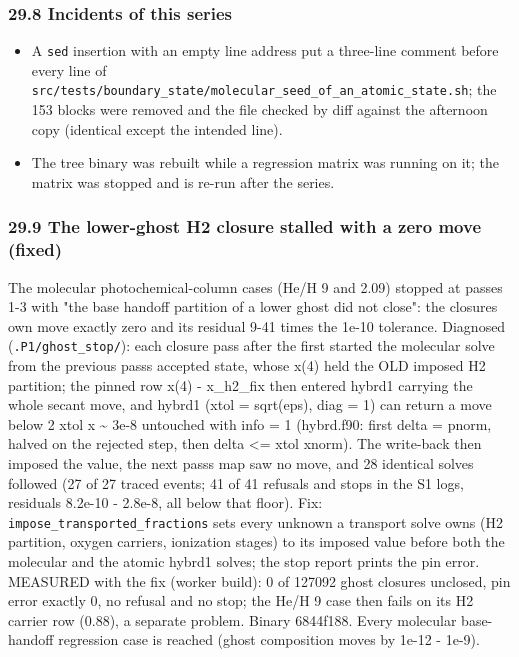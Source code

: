 \documentclass[english,a4paper]{my_memo}
\providecommand{\tightlist}{\setlength{\itemsep}{0pt}\setlength{\parskip}{0pt}}
\begin{document}
\subsubsection{29.8 Incidents of this series}\label{298-incidents-of-this-series}

\begin{itemize}
\tightlist
\item
  A \texttt{sed} insertion with an empty line address put a three-line comment
  before every line of \texttt{src/tests/boundary\_state/molecular\_seed\_of\_an\_atomic\_state.sh};
  the 153 blocks were removed and the file checked by diff against the
  afternoon copy (identical except the intended line).
\item
  The tree binary was rebuilt while a regression matrix was running on it;
  the matrix was stopped and is re-run after the series.
\end{itemize}

\subsubsection{29.9 The lower-ghost H2 closure stalled with a zero move (fixed)}\label{299-the-lower-ghost-h2-closure-stalled-with-a-zero-move-fixed}

The molecular photochemical-column cases (He/H 9 and 2.09) stopped at
passes 1-3 with "the base handoff partition of a lower ghost did not close":
the closure\textquotesingle s own move exactly zero and its residual 9-41 times the 1e-10
tolerance. Diagnosed (\texttt{.P1/ghost\_stop/}): each closure pass after the first
started the molecular solve from the previous pass\textquotesingle s accepted state, whose
x(4) held the OLD imposed H2 partition; the pinned row x(4) - x\_h2\_fix then
entered hybrd1 carrying the whole secant move, and hybrd1 (xtol = sqrt(eps),
diag = 1) can return a move below 2 xtol \textbar\textbar x\textbar\textbar{} \textasciitilde{} 3e-8 untouched with
info = 1 (hybrd.f90: first delta = pnorm, halved on the rejected step, then
delta \textless= xtol xnorm). The write-back then imposed the value, the next pass\textquotesingle s
map saw no move, and 28 identical solves followed (27 of 27 traced events;
41 of 41 refusals and stops in the S1 logs, residuals 8.2e-10 - 2.8e-8, all
below that floor). Fix: \texttt{impose\_transported\_fractions} sets every unknown a
transport solve owns (H2 partition, oxygen carriers, ionization stages) to
its imposed value before both the molecular and the atomic hybrd1 solves;
the stop report prints the pin error. MEASURED with the fix (worker build):
0 of 127092 ghost closures unclosed, pin error exactly 0, no refusal and no
stop; the He/H 9 case then fails on its H2 carrier row (0.88), a separate
problem. Binary 6844f188. Every molecular base-handoff regression case is
reached (ghost composition moves by 1e-12 - 1e-9).
\end{document}
